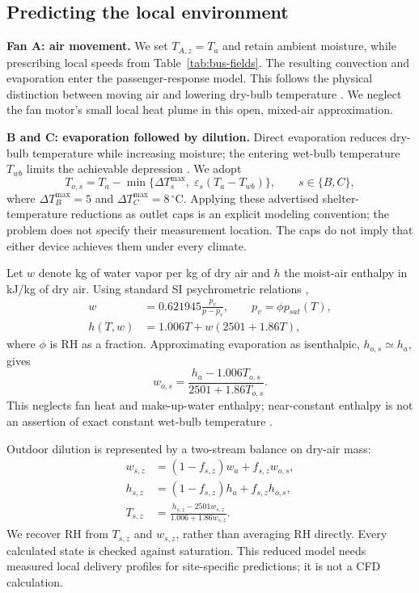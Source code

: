 \documentclass[12pt]{article}
\begin{document}
\subsection{Predicting the local environment}

\noindent\textbf{Fan A: air movement.} We set $T_{A,z}=T_a$ and retain ambient moisture, while prescribing local speeds from Table~\ref{tab:bus-fields}. The resulting convection and evaporation enter the passenger-response model. This follows the physical distinction between moving air and lowering dry-bulb temperature \cite{fanguide}. We neglect the fan motor's small local heat plume in this open, mixed-air approximation.

\noindent\textbf{B and C: evaporation followed by dilution.} Direct evaporation reduces dry-bulb temperature while increasing moisture; the entering wet-bulb temperature $T_{wb}$ limits the achievable depression \cite{evapequip}. We adopt
\begin{equation}
 T_{o,s}=T_a-\min\{\Delta T_s^{\max},\;\varepsilon_s(T_a-T_{wb})\},
 \qquad s\in\{B,C\},
\label{eq:outlet}
\end{equation}
where $\Delta T_B^{\max}=5$ and $\Delta T_C^{\max}=8\,^{\circ}\mathrm C$. Applying these advertised shelter-temperature reductions as outlet caps is an explicit modeling convention; the problem does not specify their measurement location. The caps do not imply that either device achieves them under every climate.

Let $w$ denote kg of water vapor per kg of dry air and $h$ the moist-air enthalpy in kJ/kg of dry air. Using standard SI psychrometric relations \cite{psychrolib},
\begin{align}
 w&=0.621945\frac{p_v}{p-p_v},\qquad p_v=\phi p_{sat}(T),\\
 h(T,w)&=1.006T+w(2501+1.86T),
\label{eq:enthalpy}
\end{align}
where $\phi$ is RH as a fraction. Approximating evaporation as isenthalpic, $h_{o,s}\simeq h_a$, gives
\begin{equation}
 w_{o,s}=\frac{h_a-1.006T_{o,s}}{2501+1.86T_{o,s}}.
\end{equation}
This neglects fan heat and make-up-water enthalpy; near-constant enthalpy is not an assertion of exact constant wet-bulb temperature \cite{evap}.

Outdoor dilution is represented by a two-stream balance on dry-air mass:
\begin{align}
 w_{s,z}&=(1-f_{s,z})w_a+f_{s,z}w_{o,s},\\
 h_{s,z}&=(1-f_{s,z})h_a+f_{s,z}h_{o,s},\\
 T_{s,z}&=\frac{h_{s,z}-2501w_{s,z}}{1.006+1.86w_{s,z}}.
\label{eq:mixing}
\end{align}
We recover RH from $T_{s,z}$ and $w_{s,z}$, rather than averaging RH directly. Every calculated state is checked against saturation. This reduced model needs measured local delivery profiles for site-specific predictions; it is not a CFD calculation.
\end{document}
